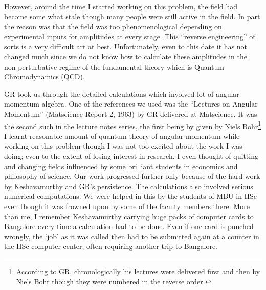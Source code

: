 However, around the time I started working on this problem, the field had become some what stale though many people were still active in the field. In part the reason was that the field was too phenomenological depending on experimental inputs for amplitudes at every stage. This “reverse engineering” of sorts is a very difficult art at best. Unfortunately, even to this date it has not changed much since we do not know how to calculate these amplitudes in the non-perturbative regime of the fundamental theory which is Quantum Chromodynamics (QCD).

GR took us through the detailed calculations which involved lot of angular momentum algebra. One of the references we used was the “Lectures on Angular Momentum” (Matscience Report 2, 1963) by GR delivered at Matscience. It was the second such in the lecture notes series, the first being by given by Niels Bohr\footnote{According to GR, chronologically his lectures were delivered first and then by Niels Bohr though they were numbered in the reverse order.} I learnt reasonable amount of quantum theory of angular momentum while working on this problem though I was not too excited about the work I was doing; even to the extent of losing interest in research. I even thought of quitting and changing fields influenced by some brilliant students in economics and philosophy of science. Our work progressed further only because of the hard work by Keshavamurthy and GR’s persistence. The calculations also involved serious numerical computations. We were helped in this by the students of MBU in IISc even though it was frowned upon by some of the faculty members there. More than me, I remember Keshavamurthy carrying huge packs of computer cards to Bangalore every time a calculation had to be done. Even if one card is punched wrongly, the ‘job’ as it was called then had to be submitted again at a counter in the IISc computer center; often requiring another trip to Bangalore.

